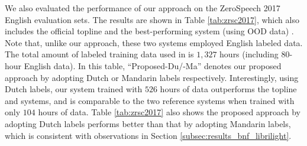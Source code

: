 \documentclass[a4paper]{article}
\begin{document}
\begin{table}[!t]
\renewcommand\arraystretch{0.70}
\centering
\caption{ABX error rates of  BNFs  on ZeroSpeech 2017 English evaluation sets. Models are trained with  Libri-light.}
\label{tab:zrsc2017}
\end{table}
We also evaluated the performance of  our approach 
on the ZeroSpeech 2017 English evaluation sets. The results are shown in Table \ref{tab:zrsc2017}, which also includes the official topline \cite{dunbar2017zero}  and the best-performing system (using OOD data) \cite{shibata2017composite}. 
Note that, unlike our approach, these two systems employed English labeled data. 
The total amount of labeled training data used in \cite{shibata2017composite} is $1,327$ hours (including $80$-hour English data).
In this table, ``Proposed-Du/-Ma'' denotes our proposed approach by adopting Dutch or Mandarin labels  respectively.
Interestingly, using Dutch labels, our system trained with $526$ hours of data outperforms the topline and \cite{shibata2017composite} systems, and is comparable to the two reference systems when trained with only $104$ hours of data. Table \ref{tab:zrsc2017} also shows the proposed approach by adopting Dutch labels performs better than that by adopting Mandarin labels,  which is consistent with observations in Section \ref{subsec:results_bnf_librilight}.
\end{document}
